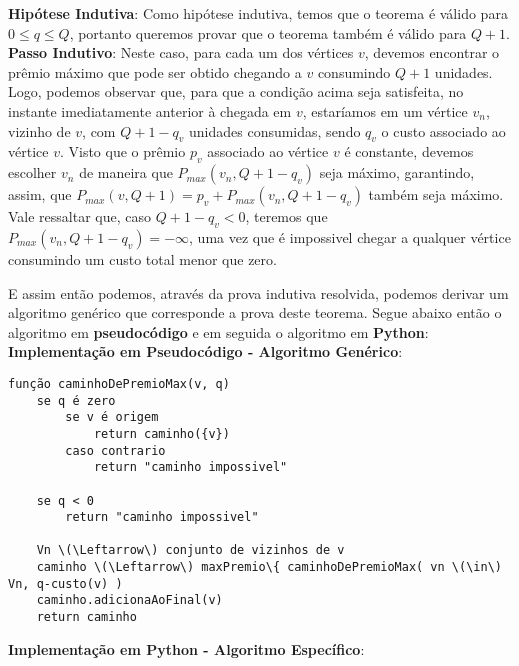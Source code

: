 \documentclass{article}
\begin{document}
\textbf{Hipótese Indutiva}: Como hipótese indutiva, temos que o teorema é válido para $0 \leq q \leq Q$, portanto queremos provar que o teorema também é válido para $Q+1$.\\

\textbf{Passo Indutivo}: Neste caso, para cada um dos vértices $v$, devemos encontrar o prêmio máximo que pode ser obtido chegando a $v$ consumindo $Q+1$ unidades. Logo, podemos observar que, para que a condição acima seja satisfeita, no instante imediatamente anterior à chegada em $v$, estaríamos em um vértice $v_n$, vizinho de $v$, com $Q+1-q_v$ unidades consumidas, sendo $q_v$ o custo associado ao vértice $v$. Visto que o prêmio $p_v$ associado ao vértice $v$ é constante, devemos escolher $v_n$ de maneira que $P_{max}(v_n,Q+1-q_v)$ seja máximo, garantindo, assim, que $P_{max}(v,Q+1) = p_v + P_{max}(v_n,Q+1-q_v)$ também seja máximo. Vale ressaltar que, caso $Q+1-q_v < 0$, teremos que $P_{max}(v_n,Q+1-q_v) = -\infty$, uma vez que é impossivel chegar a qualquer vértice consumindo um custo total menor que zero.

E assim então podemos, através da prova indutiva resolvida, podemos derivar um algoritmo genérico que corresponde a prova deste teorema. Segue abaixo então o algoritmo em \textbf{pseudocódigo} e em seguida o algoritmo em \textbf{Python}:\\

\textbf{Implementação em Pseudocódigo - Algoritmo Genérico}:

{\color{ogreen}
\begin{verbatim}
função caminhoDePremioMax(v, q)
    se q é zero
        se v é origem
            return caminho({v})
        caso contrario
            return "caminho impossivel"

    se q < 0
        return "caminho impossivel"

    Vn \(\Leftarrow\) conjunto de vizinhos de v
    caminho \(\Leftarrow\) maxPremio\{ caminhoDePremioMax( vn \(\in\) Vn, q-custo(v) )
    caminho.adicionaAoFinal(v)
    return caminho
\end{verbatim}
}

\pagebreak

\textbf{Implementação em Python - Algoritmo Específico}:
\end{document}
